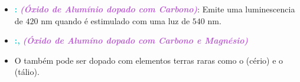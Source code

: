 \documentclass[11pt,a4paper]{article}
\begin{document}
	\begin{tcolorbox}[width=\textwidth, colback={white}, colbacktitle={DarkTurquoise!50!white}, title={$\bigstar$ \LobsterTwo{Materiais OSL} $\bigstar$}, coltitle={CarnationPink}, colframe={DarkTurquoise}, fonttitle=\rmfamily\bfseries\Large, breakable]
		\begin{itemize}[label=\textcolor{CarnationPink}{$\star$}]
			\item \textcolor{DarkTurquoise}{\textbf{:}} \textcolor{MediumOrchid}{\textit{\textbf{(Óxido de Alumínio dopado com Carbono)}}}: Emite uma luminescencia de $420 \text{ nm}$ quando é estimulado com uma luz de $540 \text{ nm}.$
			\item \textcolor{DarkTurquoise}{\textbf{:, }} \textcolor{MediumOrchid}{\textit{\textbf{(Óxido de Alumíno dopado com Carbono e Magnésio)}}}
			\item O \textcolor{DarkTurquoise}{\textbf{}} também pode ser dopado com elementos terras raras como o \textcolor{DarkTurquoise}{} (cério) e o \textcolor{DarkTurquoise}{} (tálio).
		\end{itemize}
	\end{tcolorbox}

	
\end{document}
